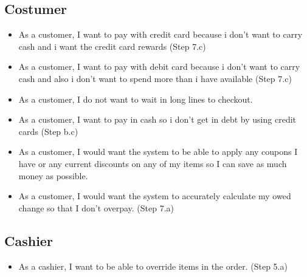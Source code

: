 \documentclass[12pt]{article}
\begin{document}
\subsection{Costumer}
    \begin{itemize}
        \item As a customer, I want to pay with credit card because 
        i don’t want to carry cash and i want the credit 
        card rewards (Step 7.c)
        \item As a customer, I want to pay with debit card because i don’t 
        want to carry cash and also i don’t want to spend 
        more than i have available (Step 7.c)
        \item As a customer, I do not want to wait in long lines to checkout.
        \item As a customer, I want to pay in cash so i don’t get in 
        debt by using credit cards (Step b.c)
        \item As a customer, I would want the system to be able to apply any 
        coupons I have or any current discounts on any of my items 
        so I can save as much money as possible.
        \item As a customer, I would want the system to accurately 
        calculate my owed change so that I don’t overpay. (Step 7.a)
    \end{itemize}
\subsection{Cashier}
\begin{itemize}
    \item As a cashier, I want to be able to override items in 
    the order. (Step 5.a)
\end{itemize}
\end{document}
